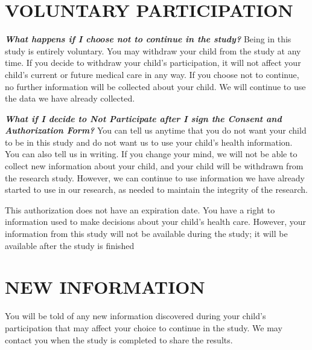 \documentclass[11pt]{article}
\begin{document}
%
{%
\section{VOLUNTARY PARTICIPATION}
\label{sec:voluntaryparticipation}
{  \textbf{\textit{What happens if I choose not to continue in the study?}} 
Being in this study is entirely voluntary.  You may withdraw your child from the study at any time. If you decide to withdraw your child's participation, it will not affect your child's current or future medical care in any way. If you choose not to continue, no further information will be collected about your child. We will continue to use the data we have already collected. 

  \textbf{\textit{What if I decide to Not Participate after I sign the Consent and Authorization Form?}} 
You can tell us anytime that you do not want your child to be in this study and do not want us to use your child's health information. You can also tell us in writing. If you change your mind, we will not be able to collect new information about your child, and your child will be withdrawn from the research study. However, we can continue to use information we have already started to use in our research, as needed to maintain the integrity of the research.

This authorization does not have an expiration date. You have a right to information used to make decisions about your child's health care. However, your information from this study will not be available during the study; it will be available after the study is finished}
}%
{}%

%
{%
\section{NEW INFORMATION}
\label{sec:newinfo}
{You will be told of any new information discovered during your child's participation that may affect your choice to continue in the study.  We may contact you when the study is completed to share the results. }
}%
{}%
\end{document}
